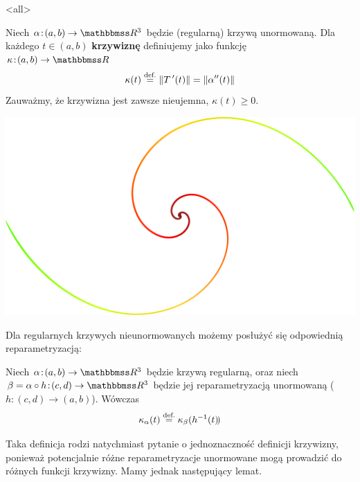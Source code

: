 \mode<all>{}
\begin{frame}
\begin{definicja}
Niech $\alpha\colon(a,b)\to \R^3$ będzie (regularną) krzywą unormowaną. Dla każdego $t\in (a,b)$ \textbf{krzywiznę} definiujemy jako funkcję $\kappa\colon (a,b)\to\R$
\[\kappa(t)\define\|T\,'(t)\|=\|\alpha''(t)\|\]
Zauważmy, że krzywizna jest zawsze nieujemna, $\kappa(t)\geqslant 0$.
\end{definicja}
\end{frame}
\begin{frame}
\begin{center}
\includegraphics[scale=.5]{./pictures/curvature_color.pdf}
\end{center}
\end{frame}
\begin{frame}

Dla regularnych krzywych nieunormowanych możemy posłużyć się odpowiednią reparametryzacją:
\pause \begin{definicja}
Niech $\alpha\colon (a,b)\to \R^3$ będzie krzywą regularną, oraz niech $\beta=\alpha\circ h \colon (c,d)\to \R^3$ będzie jej reparametryzacją unormowaną ($h\colon (c,d)\to (a,b)$). Wówczas \[\kappa_\alpha(t)\define\kappa_\beta(h^{-1} (t)\!)\]
\end{definicja}

\pause{}

\end{frame}
Taka definicja rodzi natychmiast pytanie o jednoznaczność definicji krzywizny, ponieważ potencjalnie różne reparametryzacje unormowane mogą prowadzić do różnych funkcji krzywizny. Mamy jednak następujący lemat.

